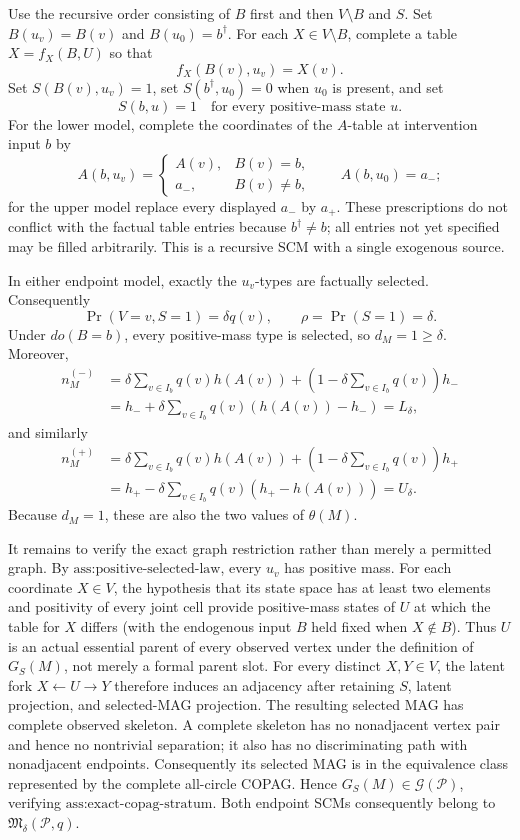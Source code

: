 Use the recursive order consisting of \(B\) first and then \(V\setminus B\) and \(S\).  Set \(B(u_v)=B(v)\) and \(B(u_0)=b^\dagger\).  For each \(X\in V\setminus B\), complete a table \(X=f_X(B,U)\) so that
\[
f_X(B(v),u_v)=X(v).
\]
Set \(S(B(v),u_v)=1\), set \(S(b^\dagger,u_0)=0\) when \(u_0\) is present, and set
\[
S(b,u)=1\quad\text{for every positive-mass state }u.
\]
For the lower model, complete the coordinates of the \(A\)-table at intervention input \(b\) by
\[
A(b,u_v)=
\begin{cases}
A(v),&B(v)=b,\\
a_-,&B(v)\neq b,
\end{cases}
\qquad A(b,u_0)=a_-;
\]
for the upper model replace every displayed \(a_-\) by \(a_+\).  These prescriptions do not conflict with the factual table entries because \(b^\dagger\neq b\); all entries not yet specified may be filled arbitrarily.  This is a recursive SCM with a single exogenous source.

In either endpoint model, exactly the \(u_v\)-types are factually selected.  Consequently
\[
\Pr(V=v,S=1)=\delta q(v),\qquad \rho=\Pr(S=1)=\delta.
\]
Under \(do(B=b)\), every positive-mass type is selected, so \(d_M=1\geq\delta\).  Moreover,
\[
\begin{aligned}
n_M^{(-)}
&=\delta\sum_{v\in I_b}q(v)h(A(v))
+\left(1-\delta\sum_{v\in I_b}q(v)\right)h_-\\
&=h_-+\delta\sum_{v\in I_b}q(v)(h(A(v))-h_-)=L_\delta,
\end{aligned}
\]
and similarly
\[
\begin{aligned}
n_M^{(+)}
&=\delta\sum_{v\in I_b}q(v)h(A(v))
+\left(1-\delta\sum_{v\in I_b}q(v)\right)h_+\\
&=h_+-\delta\sum_{v\in I_b}q(v)(h_+-h(A(v)))=U_\delta.
\end{aligned}
\]
Because \(d_M=1\), these are also the two values of \(\theta(M)\).

It remains to verify the exact graph restriction rather than merely a permitted graph.  By \(\text{ass:positive-selected-law}\), every \(u_v\) has positive mass.  For each coordinate \(X\in V\), the hypothesis that its state space has at least two elements and positivity of every joint cell provide positive-mass states of \(U\) at which the table for \(X\) differs (with the endogenous input \(B\) held fixed when \(X\notin B\)).  Thus \(U\) is an actual essential parent of every observed vertex under the definition of \(G_S(M)\), not merely a formal parent slot.  For every distinct \(X,Y\in V\), the latent fork \(X\leftarrow U\rightarrow Y\) therefore induces an adjacency after retaining \(S\), latent projection, and selected-MAG projection.  The resulting selected MAG has complete observed skeleton.  A complete skeleton has no nonadjacent vertex pair and hence no nontrivial separation; it also has no discriminating path with nonadjacent endpoints.  Consequently its selected MAG is in the equivalence class represented by the complete all-circle COPAG.  Hence \(G_S(M)\in\mathcal G(\mathcal P)\), verifying \(\text{ass:exact-copag-stratum}\).  Both endpoint SCMs consequently belong to \(\mathfrak M_\delta(\mathcal P,q)\).

